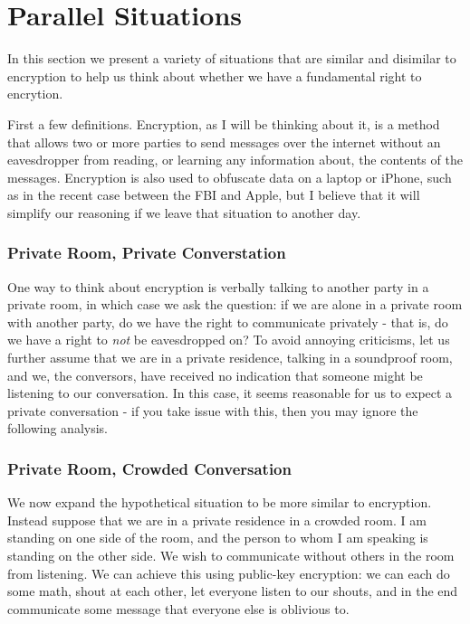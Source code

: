 \documentclass[11pt]{article}
\begin{document}
\section{Parallel Situations}
In this section we present a variety of situations that are similar and disimilar to encryption to help us think about whether we have a fundamental right to encrytion.

First a few definitions.
Encryption, as I will be thinking about it, is a method that allows two or more parties to send messages over the internet without an eavesdropper from reading, or learning any information about, the contents of the messages.
Encryption is also used to obfuscate data on a laptop or iPhone, such as in the recent case between the FBI and Apple, but I believe that it will simplify our reasoning if we leave that situation to another day.


\subsubsection{Private Room, Private Converstation}
One way to think about encryption is verbally talking to another party in a private room, in which case we ask the question: if we are alone in a private room with another party, do we have the right to communicate privately - that is, do we have a right to \textit{not} be eavesdropped on?
To avoid annoying criticisms, let us further assume that we are in a private residence, talking in a soundproof room, and we, the conversors, have received no indication that someone might be listening to our conversation.
In this case, it seems reasonable for us to expect a private conversation - if you take issue with this, then you may ignore the following analysis.

\subsubsection{Private Room, Crowded Conversation}

We now expand the hypothetical situation to be more similar to encryption.
Instead suppose that we are in a private residence in a crowded room. 
I am standing on one side of the room, and the person to whom I am speaking is standing on the other side.
We wish to communicate without others in the room from listening. 
We can achieve this using public-key encryption: we can each do some math, shout at each other, let everyone listen to our shouts, and in the end communicate some message that everyone else is oblivious to.
\end{document}
